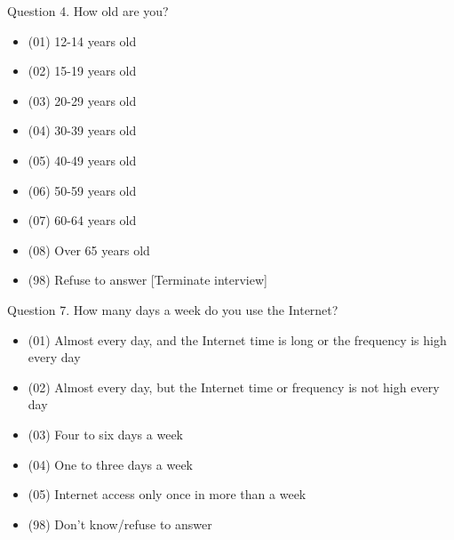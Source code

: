 \documentclass{beamer}
\begin{document}
\begin{frame}{Question 4. How old are you?}
    \begin{itemize}
        \item (01)  12-14  years  old
        \item (02)  15-19  years  old
        \item (03)  20-29  years  old
        \item (04)  30-39  years  old
        \item (05)  40-49  years  old
        \item (06)  50-59  years  old
        \item (07)  60-64  years  old
        \item (08)  Over  65  years  old
        \item (98)  Refuse  to  answer  [Terminate interview]
    \end{itemize}
\end{frame}

\begin{frame}{Question 7. How many days a week do you use the Internet?}
    \begin{itemize}
        \item (01) Almost every day, and the Internet time is long or the frequency is high every day
        \item (02) Almost every day, but the Internet time or frequency is not high every day
        \item (03) Four to six days a week
        \item (04) One to three days a week
        \item (05) Internet access only once in more than a week
        \item (98) Don't know/refuse to answer
    \end{itemize}
\end{frame}
\end{document}
